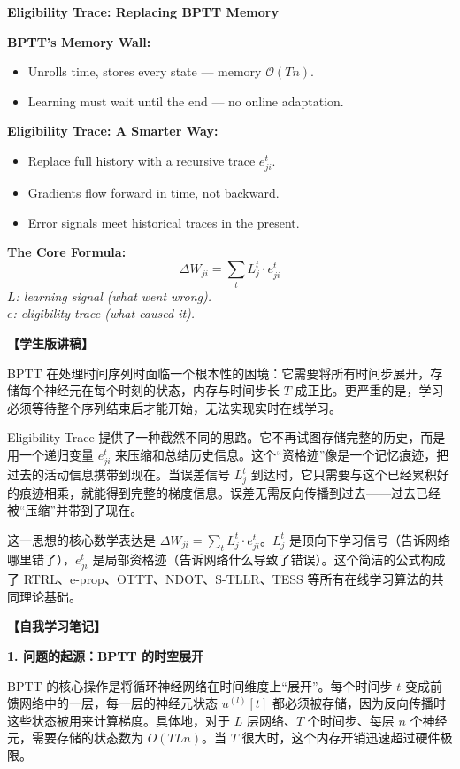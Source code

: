 \documentclass[journal,12pt,onecolumn]{IEEEtran}
\begin{document}
\bigskip\noindent\textbf{Eligibility Trace: Replacing BPTT Memory}\par\smallskip
\textbf{BPTT's Memory Wall:}
\begin{itemize}
    \item Unrolls time, stores every state — memory $\mathcal{O}(T n)$.
    \item Learning must wait until the end — no online adaptation.
\end{itemize}
\textbf{Eligibility Trace: A Smarter Way:}
\begin{itemize}
    \item Replace full history with a recursive trace $e_{ji}^t$.
    \item Gradients flow forward in time, not backward.
    \item Error signals meet historical traces in the present.
\end{itemize}
\textbf{The Core Formula:}
\begin{equation}
    \Delta W_{ji} = \sum_t L_j^t \cdot e_{ji}^t
\end{equation}
\emph{$L$: learning signal (what went wrong).\\
$e$: eligibility trace (what caused it).}

\textbf{【学生版讲稿】}

BPTT 在处理时间序列时面临一个根本性的困境：它需要将所有时间步展开，存储每个神经元在每个时刻的状态，内存与时间步长 $T$ 成正比。更严重的是，学习必须等待整个序列结束后才能开始，无法实现实时在线学习。

Eligibility Trace 提供了一种截然不同的思路。它不再试图存储完整的历史，而是用一个递归变量 $e_{ji}^t$ 来压缩和总结历史信息。这个“资格迹”像是一个记忆痕迹，把过去的活动信息携带到现在。当误差信号 $L_j^t$ 到达时，它只需要与这个已经累积好的痕迹相乘，就能得到完整的梯度信息。误差无需反向传播到过去——过去已经被“压缩”并带到了现在。

这一思想的核心数学表达是 $\Delta W_{ji} = \sum_t L_j^t \cdot e_{ji}^t$。$L_j^t$ 是顶向下学习信号（告诉网络哪里错了），$e_{ji}^t$ 是局部资格迹（告诉网络什么导致了错误）。这个简洁的公式构成了 RTRL、e-prop、OTTT、NDOT、S-TLLR、TESS 等所有在线学习算法的共同理论基础。

\bigskip\noindent\textbf{【自我学习笔记】}

\medskip\noindent\textbf{1. 问题的起源：BPTT 的时空展开}

BPTT 的核心操作是将循环神经网络在时间维度上“展开”。每个时间步 $t$ 变成前馈网络中的一层，每一层的神经元状态 $u^{(l)}[t]$ 都必须被存储，因为反向传播时这些状态被用来计算梯度。具体地，对于 $L$ 层网络、$T$ 个时间步、每层 $n$ 个神经元，需要存储的状态数为 $O(TLn)$。当 $T$ 很大时，这个内存开销迅速超过硬件极限。
\end{document}
